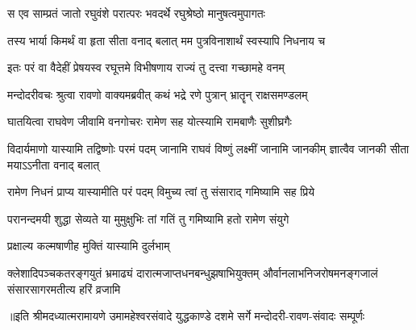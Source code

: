 \twolineshloka
{स एव साम्प्रतं जातो रघुवंशे परात्परः}
{भवदर्थे रघुश्रेष्ठो मानुषत्वमुपागतः} %

\twolineshloka
{तस्य भार्या किमर्थं वा हृता सीता वनाद् बलात्}
{मम पुत्रविनाशार्थं स्वस्यापि निधनाय च} %

\twolineshloka
{इतः परं वा वैदेहीं प्रेषयस्व रघूत्तमे}
{विभीषणाय राज्यं तु दत्त्वा गच्छामहे वनम्} %

\twolineshloka
{मन्दोदरीवचः श्रुत्वा रावणो वाक्यमब्रवीत्}
{कथं भद्रे रणे पुत्रान् भ्रातॄन् राक्षसमण्डलम्} %

\twolineshloka
{घातयित्वा राघवेण जीवामि वनगोचरः}
{रामेण सह योत्स्यामि रामबाणैः सुशीघ्रगैः} %

\threelineshloka
{विदार्यमाणो यास्यामि तद्विष्णोः परमं पदम्}
{जानामि राघवं विष्णुं लक्ष्मीं जानामि जानकीम्}
{ज्ञात्वैव जानकी सीता मयाऽऽनीता वनाद् बलात्} %

\twolineshloka
{रामेण निधनं प्राप्य यास्यामीति परं पदम्}
{विमुच्य त्वां तु संसाराद् गमिष्यामि सह प्रिये} %

\twolineshloka
{परानन्दमयी शुद्धा सेव्यते या मुमुक्षुभिः}
{तां गतिं तु गमिष्यामि हतो रामेण संयुगे} %

\onelineshloka
{प्रक्षाल्य कल्मषाणीह मुक्तिं यास्यामि दुर्लभाम्} %

\fourlineindentedshloka
{क्लेशादिपञ्चकतरङ्गयुतं भ्रमाढ्यं}
{दारात्मजाप्तधनबन्धुझषाभियुक्तम्}
{और्वानलाभनिजरोषमनङ्गजालं}
{संसारसागरमतीत्य हरिं व्रजामि} %

{॥इति श्रीमदध्यात्मरामायणे उमामहेश्वरसंवादे युद्धकाण्डे दशमे  सर्गे  मन्दोदरी-रावण-संवादः  सम्पूर्णः}
